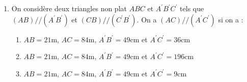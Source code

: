 \documentclass[oneside,twoside]{book}
\begin{document}
\begin{enumerate}
\item On considère deux triangles non plat $ABC$ et $A^\prime B^\prime C^\prime$ tels que $\left(AB\right)//\left(A^{\prime}B^{\prime}\right)$ et $\left(CB\right)//\left(C^{\prime}B^{\prime}\right)$. On a $\left(AC\right)//\left(A^{\prime}C^{\prime}\right)$ si on a :

\begin{enumerate}


\item\MauvaiseReponse $AB=21\mathrm{m}$, $AC=84\mathrm{m}$, $A^{\prime}B^{\prime}=49\mathrm{cm}$ et $A^{\prime}C^{\prime}=36\mathrm{cm}$

\item\BonneReponse $AB=21\mathrm{m}$, $AC=84\mathrm{m}$, $A^{\prime}B^{\prime}=49\mathrm{cm}$ et $A^{\prime}C^{\prime}=196\mathrm{cm}$

\item\MauvaiseReponse $AB=21\mathrm{m}$, $AC=84\mathrm{m}$, $A^{\prime}B^{\prime}=49\mathrm{cm}$ et $A^{\prime}C^{\prime}=9\mathrm{cm}$

\end{enumerate}



\end{enumerate}
\end{document}
